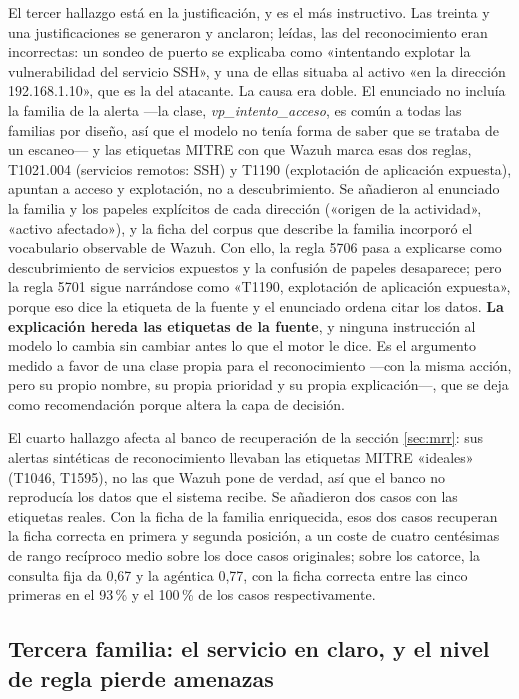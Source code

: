 El tercer hallazgo está en la justificación, y es el más instructivo. Las treinta y una
justificaciones se generaron y anclaron; leídas, las del reconocimiento eran incorrectas: un sondeo
de puerto se explicaba como «intentando explotar la vulnerabilidad del servicio SSH», y una de ellas
situaba al activo «en la dirección 192.168.1.10», que es la del atacante. La causa era doble. El
enunciado no incluía la familia de la alerta ---la clase, \emph{vp\_intento\_acceso}, es común a
todas las familias por diseño, así que el modelo no tenía forma de saber que se trataba de un
escaneo--- y las etiquetas MITRE con que Wazuh marca esas dos reglas, T1021.004 (servicios remotos:
SSH) y T1190 (explotación de aplicación expuesta), apuntan a acceso y explotación, no a
descubrimiento. Se añadieron al enunciado la familia y los papeles explícitos de cada dirección
(«origen de la actividad», «activo afectado»), y la ficha del corpus que describe la familia
incorporó el vocabulario observable de Wazuh. Con ello, la regla 5706 pasa a explicarse como
descubrimiento de servicios expuestos y la confusión de papeles desaparece; pero la regla 5701
sigue narrándose como «T1190, explotación de aplicación expuesta», porque eso dice la etiqueta de
la fuente y el enunciado ordena citar los datos. \textbf{La explicación hereda las etiquetas de la
fuente}, y ninguna instrucción al modelo lo cambia sin cambiar antes lo que el motor le dice. Es el
argumento medido a favor de una clase propia para el reconocimiento ---con la misma acción, pero su
propio nombre, su propia prioridad y su propia explicación---, que se deja como recomendación
porque altera la capa de decisión.

El cuarto hallazgo afecta al banco de recuperación de la sección \ref{sec:mrr}: sus alertas
sintéticas de reconocimiento llevaban las etiquetas MITRE «ideales» (T1046, T1595), no las que
Wazuh pone de verdad, así que el banco no reproducía los datos que el sistema recibe. Se añadieron
dos casos con las etiquetas reales. Con la ficha de la familia enriquecida, esos dos casos recuperan
la ficha correcta en primera y segunda posición, a un coste de cuatro centésimas de rango
recíproco medio sobre los doce casos originales; sobre los catorce, la consulta fija da 0,67 y la
agéntica 0,77, con la ficha correcta entre las cinco primeras en el 93\,\% y el 100\,\% de los
casos respectivamente.

\subsection{Tercera familia: el servicio en claro, y el nivel de regla pierde amenazas}
\label{sec:tercera-familia}

